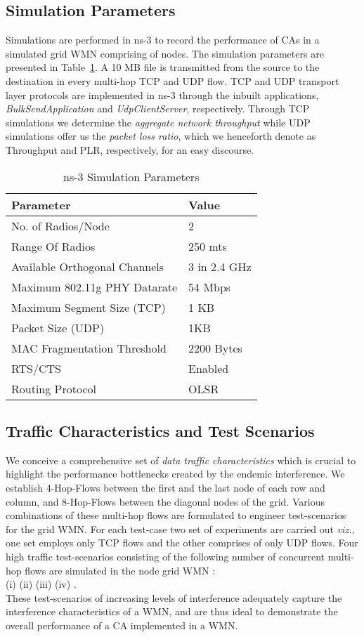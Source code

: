 \documentclass[conference]{IEEEtran}
\begin{document}
\subsection{Simulation Parameters}
Simulations are performed in ns-3 \cite{NS-3} to record the performance of CAs in a simulated  grid WMN comprising of  nodes. The simulation parameters are presented in Table~\ref{sim}. A 10 MB file is transmitted from the source to the destination in every multi-hop TCP and UDP flow. TCP and UDP transport layer protocols are implemented in \mbox{ns-3} through the inbuilt applications, \textit{BulkSendApplication} and \textit{UdpClientServer}, respectively. Through TCP simulations we determine the \textit{aggregate network throughput} while UDP simulations offer us the \textit{packet loss ratio}, which we henceforth denote as Throughput and PLR, respectively, for an easy discourse. 
\begin{table} [h!]
\caption{ns-3 Simulation Parameters}
\center 
\begin{tabular}{|p{5cm}|p{3cm}|}
\hline
\bfseries
 Parameter&\bfseries Value \\ [0.2ex]
 \hline
\hline
No. of Radios/Node&2   \\
\hline
Range Of Radios&250 mts   \\
\hline
Available Orthogonal Channels&3 in 2.4 GHz  \\
\hline
Maximum 802.11g PHY Datarate &54 Mbps  \\
\hline
Maximum Segment Size (TCP)&1 KB   \\
\hline
Packet Size (UDP)&1KB\\
\hline
MAC Fragmentation Threshold&2200 Bytes  \\
\hline
RTS/CTS &Enabled  \\
\hline
Routing Protocol &OLSR    \\
\hline
\end{tabular}
\label{sim}
\end{table}     

\subsection{Traffic Characteristics and Test Scenarios}
We conceive a comprehensive set of \textit{data traffic characteristics} which is crucial to highlight the performance bottlenecks created by the endemic interference. We establish \mbox{4-Hop-Flows} between the first and the last node of each row and column, and \mbox{8-Hop-Flows} between the diagonal nodes of the grid. Various combinations of these multi-hop flows are formulated to engineer test-scenarios for the grid WMN. For each test-case two set of experiments are carried out \emph{viz.}, one set employs only TCP flows and the other comprises of only UDP flows. Four high traffic test-scenarios consisting of the following number of concurrent multi-hop flows are simulated in the  node grid WMN :\\ 
(i)  \quad \quad  (ii)  \quad \quad (iii)   \quad  \quad (iv) . \\
These test-scenarios of increasing levels of interference adequately capture the interference characteristics of a WMN, and are thus ideal to demonstrate the overall performance of a CA implemented in a WMN. 
 
\end{document}
